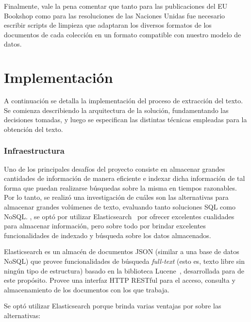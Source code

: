 Finalmente, vale la pena comentar que tanto para las publicaciones del EU Bookshop como para las
resoluciones de las Naciones Unidas fue necesario escribir scripts de limpieza que adaptaran los diversos
formatos de los documentos de cada colección en un formato compatible con nuestro modelo de datos.


\section{Implementación}

A continuación se detalla la implementación del proceso de extracción del texto. Se comienza
describiendo la arquitectura de la solución, fundamentando las decisiones tomadas, y luego se
especifican las distintas técnicas empleadas para la obtención del texto.


\subsubsection{Infraestructura}

Uno de los principales desafíos del proyecto consiste en almacenar grandes cantidades de información
de manera eficiente e indexar dicha información de tal forma que puedan realizarse búsquedas sobre
la misma en tiempos razonables. Por lo tanto, se realizó una investigación de cuáles son las
alternativas para almacenar grandes volúmenes de texto, evaluando tanto soluciones SQL como
NoSQL. \@Finalmente, se optó por utilizar Elasticsearch~\cite{Elasitcsearch} por ofrecer excelentes
cualidades para almacenar información, pero sobre todo por brindar excelentes funcionalidades de
indexado y búsqueda sobre los datos almacenados.

Elasticsearch es un almacén de documentos JSON (similar a una base de datos NoSQL) que provee
funcionalidades de búsqueda \textit{full-text} (esto es, texto libre sin ningún tipo de estructura)
basado en la biblioteca Lucene~\cite{Lucene}, desarrollada para de este propósito. Provee una
interfaz HTTP RESTful para el acceso, consulta y almacenamiento de los documentos con los que
trabaja.

Se optó utilizar Elasticsearch porque brinda varias ventajas por sobre las alternativas:


